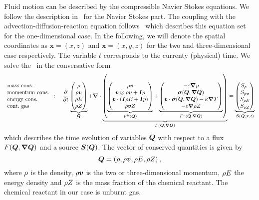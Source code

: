 \newcommand{\viscFluxDef}{
  \begin{pmatrix}
     -\diffCoeff \gradient{\Qrho}\\
     \stressT (\Q, \gradQ)  \\
     \Qv \cdot \stressT (\Q, \gradQ) - \kappa \gradient{T}\\
     -\diffCoeff \gradient{\QZ}
   \end{pmatrix}
}

Fluid motion can be described by the compressible Navier Stokes equations.
We follow the description in~\cite{dumbser2010arbitrary} for the Navier Stokes part.
The coupling with the advection-diffusion-reaction equation follows~\cite{hidalgo2011ader} which describes this equation set for the one-dimensional case.
In the following, we will denote the spatial coordinates as $\bm{x} = \left( x,z \right)$ and $\bm{x} = \left( x,y,z \right)$ for the two and three-dimensional case respectively.
The variable $t$ corresponds to the currenty (physical) time.
We solve the \pde\ in the conversative form 
\begin{equation}
 \label{eq:equation-set} 
 \begin{array}{l}
 \text{mass cons.} \\
 \text{momentum cons.} \\
 \text{energy cons.} \\
 \text{cont.\ gas} 
\end{array}
:
\quad
  \pdv{}{t}
  \underbrace{
  \begin{pmatrix}
    \Qrho\\
    \Qj\\
    \QE\\
    \QZ
    \end{pmatrix}}_{\Q}
  +
  \divergence{
  \underbrace{
  \left(
   \underbrace{\hyperFluxDef}_{\hyperFlux(\Q)}
+
\underbrace{\viscFluxDef}_{\viscFlux(\Q, \gradQ)}
  \right)}_{\flux(\Q, \gradQ)}}
 =
  \underbrace{
  \begin{pmatrix}
    \source[\Qrho\phantom{\Qrho}]\\
    \source[\Qj]\\
    \source[\QE]\\
    \source[\QZ]
    \end{pmatrix}}_{\source(\Q, \bm{x}, t)}
\end{equation}
which describes the time evolution of variables $\bm{Q}$ with respect to a flux $\flux(\Q, \gradQ)$ and a source $\source(\Q)$.
The vector of conserved quantities is given by
\begin{equation}
  \label{eq:conserved-variables}
 \bm{Q} = \left( \rho, \rho \bm{v}, \rho E, \rho Z \right),
\end{equation}
where $\rho$ is the density, $\rho \bm{v}$ is the two or three-dimensional momentum, $\rho E$ the energy density and $\rho Z$ is the mass fraction of the chemical reactant.
The chemical reactant in our case is unburnt gas.

